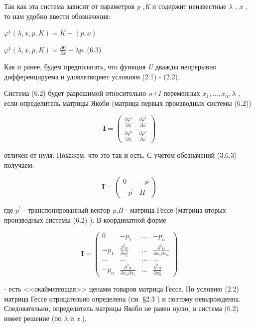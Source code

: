 \documentclass[12pt, 4paper]{book}
\begin{document}
{Так как эта система зависит от параметров \textit{p} ,\textit{K}  и содержит неизвестные $ \lambda$ , $x$ , то нам удобно ввести обозначения: 
\begin{center}
$\varphi^1(\lambda,x,p,K)=K - \left\langle p,x \right\rangle $
\end{center}
\begin{center}
$\varphi^1(\lambda,x,p,K)= \frac{\partial U}{\partial x} - \lambda p$. (6.3)
\end{center}
\par

Как и ранее, будем предполагать, что функция \textit{U} дважды непрерывно дифференцируема и удовлетворяет условиям (2.1) - (2.2).
\par

Система (6.2) будет разрешимой относительно \textit{n+1} переменных $x_1,...,x_n,\lambda $ , если определитель матрицы Якоби (матрица первых производных системы (6.2)) 
\begin{center}
\begin{displaymath}
\mathbf{I} =
\left( \begin{array}{cccc}
\frac{\partial \varphi^1}{\partial \lambda} & \frac{\partial \varphi^1}{\partial x} \\
\frac{\partial \varphi^2}{\partial \lambda} & \frac{\partial \varphi^2}{\partial x}
\end{array} \right)
\end{displaymath}
\end{center}
отличен от нуля. Покажем, что это так и есть. С учетом обозначений (3.6.3) получаем: 
\begin{center}
\begin{displaymath}
\mathbf{I} =
\left( \begin{array}{cccc}
0 & -p\\
-p^{'} & H
\end{array} \right)
\end{displaymath}
\end{center}
где $p^{'}$ - транспонированный вектор \textit{p},\textit{H} - матрица Гессе (матрица вторых производных системы (6.2) ). В координатной форме 
\begin{center}
\begin{displaymath}
\mathbf{I} =
\left( \begin{array}{cccc}
0 & -p_1 & \ldots & -p_n\\
-p_{1} & \frac{\partial^{2}u} {\partial x_1^{2}} & \ldots & \frac{\partial^{2}u} {\partial x_1 \partial x_n}\\
\ldots & \ldots & \ldots & \ldots \\
-p_n & \frac{\partial^{2}u} {\partial x_n \partial x_1} & \ldots & \frac{\partial^{2}u} {\partial x_{n}^{2}}
\end{array} \right)
\end{displaymath}
\end{center}
- есть <<окаймляющая>> ценами товаров матрица Гессе. По условию (2.2) матрица Гессе отрицательно определена (см. §2.3 ) и поэтому невырожденна. Следовательно, определитель матрицы Якоби не равен нулю, и система (6.2) имеет решение (по $\lambda $ и \textit{x} ). 
\par

}
\end{document}
